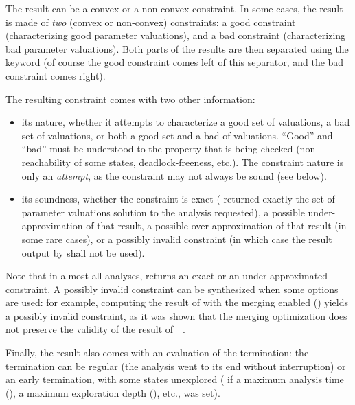 The result can be a convex or a non-convex constraint.
In some cases, the result is made of \emph{two} (convex or non-convex) constraints: a good constraint (characterizing good parameter valuations), and a bad constraint (characterizing bad parameter valuations).
Both parts of the results are then separated using the keyword  (of course the good constraint comes left of this separator, and the bad constraint comes right).

The resulting constraint comes with two other information:
\begin{itemize}
	\item its nature, \ie{} whether it attempts to characterize a good set of valuations, a bad set of valuations, or both a good set and a bad of valuations.
	      ``Good'' and ``bad'' must be understood to the property that is being checked (non-reachability of some states, deadlock-freeness, etc.).
	      The constraint nature is only an \emph{attempt}, as the constraint may not always be sound (see below).
	\item its soundness, \ie{} whether the constraint is exact (\imitator{} returned exactly the set of parameter valuations solution to the analysis requested), a possible under-approximation of that result, a possible over-approximation of that result (in some rare cases), or a possibly invalid constraint (in which case the result output by \imitator{} shall not be used).
\end{itemize}
Note that in almost all analyses, \imitator{} returns an exact or an under-approximated constraint.
A possibly invalid constraint can be synthesized when some options are used: for example, computing the result of \IM{} with the merging enabled () yields a possibly invalid constraint, as it was shown that the merging optimization does not preserve the validity of the result of~\IM{}~\cite{AFS13atva}.



Finally, the result also comes with an evaluation of the termination: the termination can be regular (the analysis went to its end without interruption) or an early termination, with some states unexplored (\eg{} if a maximum analysis time (), a maximum exploration depth (), etc., was set).


